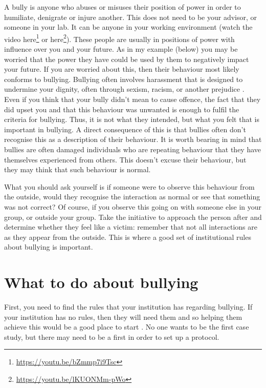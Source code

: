 \documentclass[
]{krantz}
\renewcommand{\href}[2]{#2\footnote{\url{#1}}}
\begin{document}
A bully is anyone who abuses or misuses their position of power in order to humiliate, denigrate or injure another. This does not need to be your advisor, or someone in your lab. It can be anyone in your working environment (watch the video \href{https://youtu.be/bZmmp7i9Tsc}{here} or \href{https://youtu.be/lKUONMm-pWo}{here}). These people are usually in positions of power with influence over you and your future. As in my example (below) you may be worried that the power they have could be used by them to negatively impact your future. If you are worried about this, then their behaviour most likely conforms to bullying. Bullying often involves harassment that is designed to undermine your dignity, often through sexism, racism, or another prejudice \citep{krishna2020playing}. Even if you think that your bully didn't mean to cause offence, the fact that they did upset you and that this behaviour was unwanted is enough to fulfil the criteria for bullying. Thus, it is not what they intended, but what you felt that is important in bullying. A direct consequence of this is that bullies often don't recognise this as a description of their behaviour. It is worth bearing in mind that bullies are often damaged individuals who are repeating behaviour that they have themselves experienced from others. This doesn't excuse their behaviour, but they may think that such behaviour is normal.

What you should ask yourself is if someone were to observe this behaviour from the outside, would they recognise the interaction as normal or see that something was not correct? Of course, if you observe this going on with someone else in your group, or outside your group. Take the initiative to approach the person after and determine whether they feel like a victim: remember that not all interactions are as they appear from the outside. This is where a good set of institutional rules about bullying is important.

\hypertarget{what-to-do-about-bullying}{%
\section{What to do about bullying}\label{what-to-do-about-bullying}}

First, you need to find the rules that your institution has regarding bullying. If your institution has no rules, then they will need them and so helping them achieve this would be a good place to start \citep{mahmoudi2021filling}. No one wants to be the first case study, but there may need to be a first in order to set up a protocol.
\end{document}
